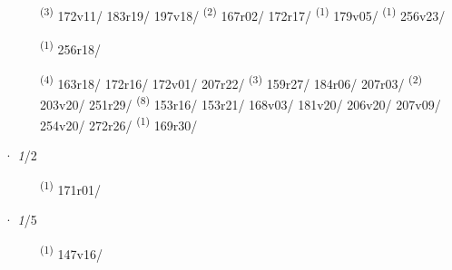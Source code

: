 \begin{description}
    \item[]  \textsuperscript{(3)} \mbox{172v11/} \mbox{183r19/} \mbox{197v18/} \CASEBREAK {} \textsuperscript{(2)} \mbox{167r02/} \mbox{172r17/} \textsuperscript{(1)} \mbox{179v05/} \textsuperscript{(1)} \mbox{256v23/}
    \item[]  \textsuperscript{(1)} \mbox{256r18/}
    \item[]  \textsuperscript{(4)} \mbox{163r18/} \mbox{172r16/} \mbox{172v01/} \mbox{207r22/} \CASEBREAK {} \textsuperscript{(3)} \mbox{159r27/} \mbox{184r06/} \mbox{207r03/} \CASEBREAK {} \textsuperscript{(2)} \mbox{203v20/} \mbox{251r29/} \CASEBREAK {} \textsuperscript{(8)} \mbox{153r16/} \mbox{153r21/} \mbox{168v03/} \mbox{181v20/} \mbox{206v20/} \mbox{207v09/} \mbox{254v20/} \mbox{272r26/} \textsuperscript{(1)} \mbox{169r30/}
\end{description}
\ENTRYEND
\noindent{} · \textit{1}/2 \LEMMALINE
\begin{description}
    \item[]  \textsuperscript{(1)} \mbox{171r01/}
\end{description}
\ENTRYEND
\noindent{} · \textit{1}/5 \LEMMALINE
\begin{description}
    \item[]  \textsuperscript{(1)} \mbox{147v16/}
\end{description}
\ENTRYEND
